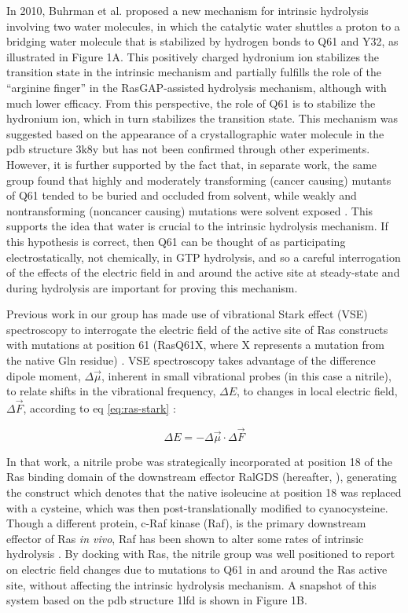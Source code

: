 In 2010, Buhrman et al. proposed a new mechanism for intrinsic hydrolysis involving two water molecules, in which the catalytic water shuttles a proton to a bridging water molecule that is stabilized by hydrogen bonds to Q61 and Y32\cite{Buhrman2010}, as illustrated in Figure 1A. 
This positively charged hydronium ion stabilizes the transition state in the intrinsic mechanism and partially fulfills the role of the ``arginine finger'' in the RasGAP-assisted hydrolysis mechanism, although with much lower efficacy. 
From this perspective, the role of Q61 is to stabilize the hydronium ion, which in turn stabilizes the transition state. 
This mechanism was suggested based on the appearance of a crystallographic water molecule in the pdb structure 3k8y\cite{Buhrman2010} but has not been confirmed through other experiments. 
However, it is further supported by the fact that, in separate work, the same group found that highly and moderately transforming (cancer causing) mutants of Q61 tended to be buried and occluded from solvent, while weakly and nontransforming (noncancer causing) mutations were solvent exposed \cite{Buhrman2007}. 
This supports the idea that water is crucial to the intrinsic hydrolysis mechanism. If this hypothesis is correct, then Q61 can be thought of as participating electrostatically, not chemically, in GTP hydrolysis, and so a careful interrogation of the effects of the electric field in and around the active site at steady-state and during hydrolysis are important for proving this mechanism.


Previous work in our group has made use of vibrational Stark effect (VSE) spectroscopy to interrogate the electric field of the active site of Ras constructs with mutations at position 61 (RasQ61X, where X represents a mutation from the native Gln residue) \cite{Stafford2012}.
VSE spectroscopy takes advantage of the difference dipole moment, $\Delta\vec{\mu}$, inherent in small vibrational probes (in this case a nitrile), to relate shifts in the vibrational frequency, $\Delta E$, to changes in local electric field, $\Delta\vec{F}$, according to eq \ref{eq:ras-stark} \cite{Andrews2000, Andrews2002, Fafarman2006, Fried2015, Slocum2018}:

\begin{equation}
\Delta E = - \Delta\vec{\mu}\cdot\Delta\vec{F}
\label{eq:ras-stark}
\end{equation}

In that work, a nitrile probe was strategically incorporated at position 18 of the Ras binding domain of the downstream effector RalGDS (hereafter, \RalB{}), generating the construct \RalBSCN{} which denotes that the native isoleucine at position 18 was replaced with a cysteine, which was then post-translationally modified to cyanocysteine. 
Though a different protein, c-Raf kinase (Raf), is the primary downstream effector of Ras \emph{in vivo}, Raf has been shown to alter some rates of intrinsic hydrolysis \cite{Buhrman2011}.
By docking \RalBSCN{} with Ras, the nitrile group was well positioned to report on electric field changes due to mutations to Q61 in and around the Ras active site, without affecting the intrinsic hydrolysis mechanism. 
A snapshot of this system based on the pdb structure 1lfd is shown in Figure 1B.


